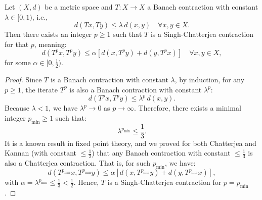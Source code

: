 \documentclass[10pt,a4paper]{amsart}
\begin{document}
\begin{theorem}
Let $ (X, d) $ be a metric space and $ T: X \to X $ a Banach contraction with constant $ \lambda \in [0, 1) $, i.e.,
\[
d(Tx, Ty) \leq \lambda \, d(x, y) \quad \forall x, y \in X.
\]
Then there exists an integer $ p \geq 1 $ such that $ T $ is a Singh-Chatterjea contraction for that $ p $, meaning:
\[
d(T^p x, T^p y) \leq \alpha \left[ d(x, T^p y) + d(y, T^p x) \right] \quad \forall x, y \in X,
\]
for some $ \alpha \in [0, \tfrac{1}{2}) $.
\end{theorem}

\begin{proof}
Since $ T $ is a Banach contraction with constant $ \lambda $, by induction, for any $ p \geq 1 $, the iterate $ T^p $ is also a Banach contraction with constant $ \lambda^p $:
\[
d(T^p x, T^p y) \leq \lambda^p \, d(x, y).
\]
Because $ \lambda < 1 $, we have $ \lambda^p \to 0 $ as $ p \to \infty $. Therefore, there exists a minimal integer $ p_{\min} \geq 1 $ such that:
\[
\lambda^{p_{\min}} \leq \frac{1}{3}.
\]
It is a known result in fixed point theory, and we proved for both Chatterjea and Kannan (with constant $\leq \frac{1}{2}$) that any Banach contraction with constant $ \leq \frac{1}{3} $ is also a Chatterjea contraction. That is, for such $ p_{\min} $, we have:
\[
d(T^{p_{\min}} x, T^{p_{\min}} y) \leq \alpha \left[ d(x, T^{p_{\min}} y) + d(y, T^{p_{\min}} x) \right],
\]
with $ \alpha = \lambda^{p_{\min}} \leq \frac{1}{3} < \frac{1}{2} $. Hence, $ T $ is a Singh-Chatterjea contraction for $ p = p_{\min} $.
\end{proof}
\end{document}
